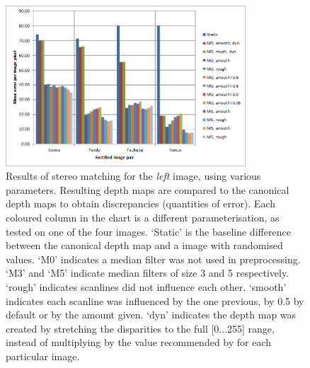 \begin{figure}[h]
  \centering
  \includegraphics[width=0.8\textwidth]{Stereo-left-report}
  \caption[Results of stereo matching (left image)]{Results of stereo matching
    for the \emph{left} image, using various parameters. Resulting depth maps
    are compared to the canonical depth maps to obtain discrepancies (quantities
    of error). Each coloured column in the chart is a different
    parameterisation, as tested on one of the four images. `Static' is the
    baseline difference between the canonical depth map and a image with
    randomised values. `M0' indicates a median filter was not used in
    preprocessing. `M3' and `M5' indicate median filters of size 3 and 5
    respectively. `rough' indicates scanlines did not influence each other.
    `smooth' indicates each scanline was influenced by the one previous, by 0.5
    by default or by the amount given. `dyn' indicates the depth map was created
    by stretching the disparities to the full [0...255] range, instead of
    multiplying by the value recommended by \cite{middlebury} for each
    particular image.}
  \label{fig:stereo-left}
\end{figure}

